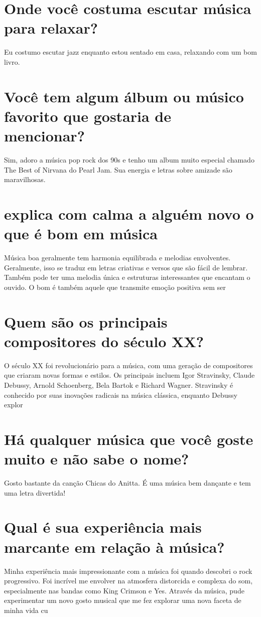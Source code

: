 \documentclass[11pt,a4paper]{article}
\begin{document}
\section{Onde você costuma escutar música para relaxar?}
Eu costumo escutar jazz enquanto estou sentado em casa, relaxando com um bom livro.

\section{Você tem algum álbum ou músico favorito que gostaria de mencionar?}
Sim, adoro a música pop rock dos 90s e tenho um album muito especial chamado The Best of Nirvana do Pearl Jam. Sua energia e letras sobre amizade são maravilhosas.

\section{explica com calma a alguém novo o que é bom em música}
Música boa geralmente tem harmonia equilibrada e melodias envolventes. Geralmente, isso se traduz em letras criativas e versos que são fácil de lembrar. Também pode ter uma melodia única e estruturas interessantes que encantam o ouvido. O bom é também aquele que transmite emoção positiva sem ser

\section{Quem são os principais compositores do século XX?}
O século XX foi revolucionário para a música, com uma geração de compositores que criaram novas formas e estilos. Os principais incluem Igor Stravinsky, Claude Debussy, Arnold Schoenberg, Bela Bartok e Richard Wagner. Stravinsky é conhecido por suas inovações radicais na música clássica, enquanto Debussy explor

\section{Há qualquer música que você goste muito e não sabe o nome?}
Gosto bastante da canção Chicas do Anitta. É uma música bem dançante e tem uma letra divertida!

\section{Qual é sua experiência mais marcante em relação à música?}
Minha experiência mais impressionante com a música foi quando descobri o rock progressivo. Foi incrível me envolver na atmosfera distorcida e complexa do som, especialmente nas bandas como King Crimson e Yes. Através da música, pude experimentar um novo gosto musical que me fez explorar uma nova faceta de minha vida cu
\end{document}
